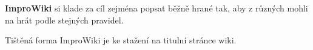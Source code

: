 \needspace{5cm} \label{improwiki} \textbf{ImproWiki}{} si klade za cíl zejména popsat běžně hrané   tak, aby  z různých  mohli na  hrát podle stejných pravidel. 
 
Tištěná forma ImproWiki je ke stažení na titulní stránce wiki. 
